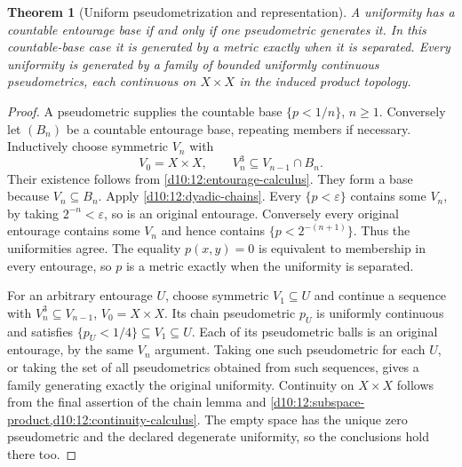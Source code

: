 \documentclass[11pt,oneside,openany]{book}
\newtheorem{theorem}{Theorem}[chapter]
\theoremstyle{definition}
\theoremstyle{remark}
\newcommand{\eps}{\varepsilon}
\begin{document}
\begin{theorem}[Uniform pseudometrization and representation]\label{d10:12:pseudometric-representation}
A uniformity has a countable entourage base if and only if one pseudometric generates it. In this countable-base case it is generated by a metric exactly when it is separated. Every uniformity is generated by a family of bounded uniformly continuous pseudometrics, each continuous on $X\times X$ in the induced product topology.
\end{theorem}
\begin{proof}
A pseudometric supplies the countable base $\{p<1/n\}$, $n\geq1$. Conversely let $(B_n)$ be a countable entourage base, repeating members if necessary. Inductively choose symmetric $V_n$ with
\[
 V_0=X\times X,\qquad V_n^3\subseteq V_{n-1}\cap B_n.
\]
Their existence follows from \cref{d10:12:entourage-calculus}. They form a base because $V_n\subseteq B_n$. Apply \cref{d10:12:dyadic-chains}. Every $\{p<\eps\}$ contains some $V_n$, by taking $2^{-n}<\eps$, so is an original entourage. Conversely every original entourage contains some $V_n$ and hence contains $\{p<2^{-(n+1)}\}$. Thus the uniformities agree. The equality $p(x,y)=0$ is equivalent to membership in every entourage, so $p$ is a metric exactly when the uniformity is separated.

For an arbitrary entourage $U$, choose symmetric $V_1\subseteq U$ and continue a sequence with $V_n^3\subseteq V_{n-1}$, $V_0=X\times X$. Its chain pseudometric $p_U$ is uniformly continuous and satisfies $\{p_U<1/4\}\subseteq V_1\subseteq U$. Each of its pseudometric balls is an original entourage, by the same $V_n$ argument. Taking one such pseudometric for each $U$, or taking the set of all pseudometrics obtained from such sequences, gives a family generating exactly the original uniformity. Continuity on $X\times X$ follows from the final assertion of the chain lemma and \cref{d10:12:subspace-product,d10:12:continuity-calculus}. The empty space has the unique zero pseudometric and the declared degenerate uniformity, so the conclusions hold there too.
\end{proof}
\end{document}
